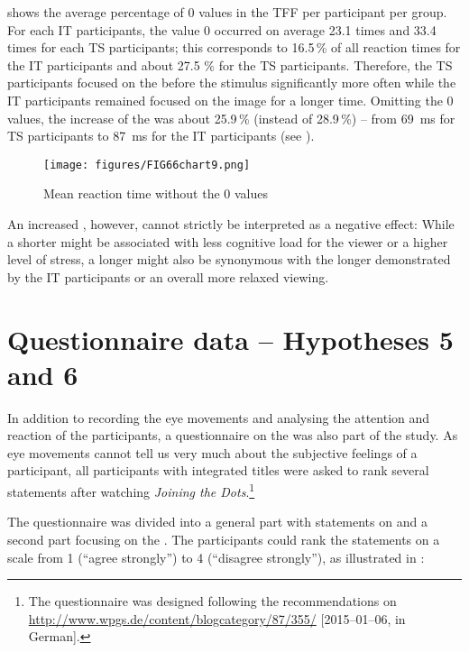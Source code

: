  shows the average percentage of 0 values in the TFF per participant per group. For each IT participants, the value 0 occurred on average 23.1 times and 33.4 times for each TS participants; this corresponds to 16.5\,\% of all reaction times for the IT participants and about 27.5 \% for the TS participants. Therefore, the TS participants focused on the  before the stimulus significantly more often while the IT participants remained focused on the image for a longer time. Omitting the 0 values, the increase of the  was about 25.9\,\% (instead of 28.9\,\%) – from 69~ms for TS participants to 87~ms for the IT participants (see ).

\begin{figure}
\texttt{[image: figures/FIG66chart9.png]}
\caption{Mean reaction time without the 0 values}
\label{fig:FIG66chart9}
\end{figure}

\newpage 
An increased , however, cannot strictly be interpreted as a negative effect: While a shorter  might be associated with less cognitive load for the viewer or a higher level of stress, a longer  might also be synonymous with the longer  demonstrated by the IT participants or an overall more relaxed viewing.

\section{Questionnaire data – Hypotheses 5 and 6}\label{sec:8.2}

In addition to recording the eye movements and analysing the attention and reaction of the participants, a questionnaire on the  was also part of the study. As eye movements cannot tell us very much about the subjective feelings of a participant, all participants with integrated titles were asked to rank several statements after watching \textit{Joining the Dots}.\footnote{The questionnaire was designed following the recommendations on \url{http://www.wpgs.de/content/blogcategory/87/355/} [2015--01--06, in German].}

The questionnaire was divided into a general part with statements on  and a second part focusing on the . The participants could rank the statements on a scale from 1 (“agree strongly”) to 4 (“disagree strongly”), as illustrated in :

